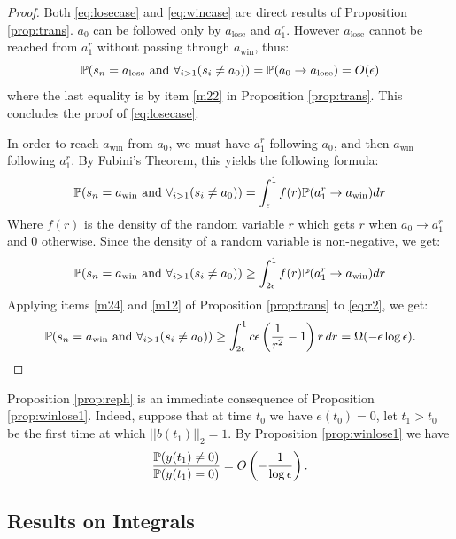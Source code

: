 {\begin{proof}
Both \eqref{eq:losecase} and \eqref{eq:wincase} are direct results of Proposition \ref{prop:trans}.
 $a_0$ can be followed only by $a_\text{lose}$ and $a_1^r$. However $a_\text{lose}$ cannot be
 reached from $a_1^r$ without passing through
 $a_\text{win}$, thus:
 $$\P(s_n=a_\text{lose} \text{ and } \ds\forall_{i>1}(s_i\neq a_0))=\P(a_0\rightarrow a_\text{lose})=O(\epsilon)$$
 where the last equality is by item \ref{m22} in Proposition \ref{prop:trans}.
 This concludes the proof of \eqref{eq:losecase}.

 In order to reach $a_\text{win}$ from $a_0$, we must have $a_1^r$ following $a_0$, and then $a_\text{win}$
  following $a_1^r$. By Fubini's Theorem, this yields the following formula:
 \begin{equation}\label{eq:r1}
 \P(s_n=a_\text{win} \text{ and } \ds\forall_{i>1}(s_i\neq a_0))=\ds\int_{\epsilon}^1 f(r) \P(a^r_1\rightarrow a_\text{win}) dr
 \end{equation}
 Where $f(r)$ is the density of the random variable $r$ which gets $r$ when
 $a_0\rightarrow a^r_1$ and $0$ otherwise. Since the density of a random variable is non-negative, we get:
 \begin{equation}\label{eq:r2}
 \P(s_n=a_\text{win} \text{ and } \ds\forall_{i>1}(s_i\neq a_0))\ge\ds\int_{2\epsilon}^1 f(r) \P(a^r_1\rightarrow a_\text{win}) dr
 \end{equation}
Applying items \ref{m24} and \ref{m12} of Proposition \ref{prop:trans} to \eqref{eq:r2}, we get:
\begin{equation}\label{eq:r3}
 \P(s_n=a_\text{win} \text{ and } \ds\forall_{i>1}(s_i\neq a_0))\ge \ds\int_{2\epsilon}^1 c\epsilon\left(\frac{1}{r^2}-1\right)r\, dr = \Omega(-\epsilon\log\epsilon).
\end{equation}
\end{proof}

Proposition \ref{prop:reph} is an immediate consequence of Proposition
\ref{prop:winlose1}. Indeed, suppose that at time $t_0$ we have
$e(t_0)=0$, let $t_1>t_0$ be the first time at which $||b(t_1)||_2=1$.
By Proposition \ref{prop:winlose1} we have
$$\frac{\P (y(t_1)\neq0)}{\P (y(t_1)=0)}=O\left(-\frac 1 {\log\epsilon}\right).$$

\subsection{Results on Integrals}\label{sec:ROI}

}
